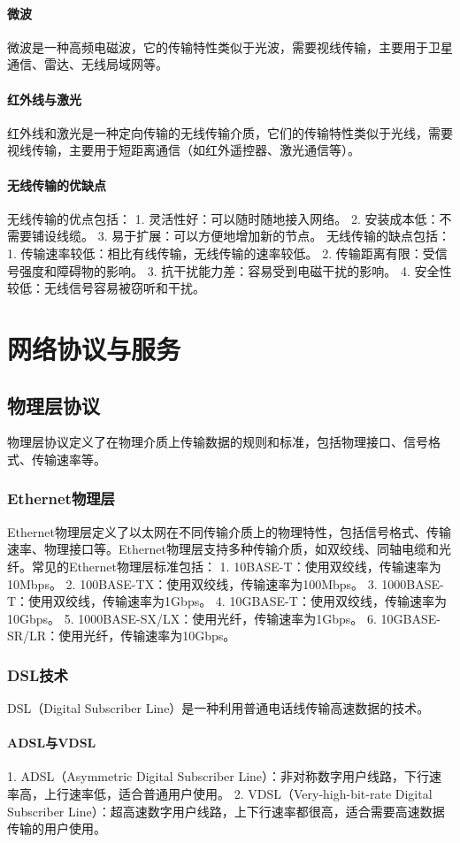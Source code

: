 \documentclass{book}
\begin{document}
\subsubsection{微波}
微波是一种高频电磁波，它的传输特性类似于光波，需要视线传输，主要用于卫星通信、雷达、无线局域网等。
\subsubsection{红外线与激光}
红外线和激光是一种定向传输的无线传输介质，它们的传输特性类似于光线，需要视线传输，主要用于短距离通信（如红外遥控器、激光通信等）。
\subsubsection{无线传输的优缺点}
无线传输的优点包括：
1. 灵活性好：可以随时随地接入网络。
2. 安装成本低：不需要铺设线缆。
3. 易于扩展：可以方便地增加新的节点。
无线传输的缺点包括：
1. 传输速率较低：相比有线传输，无线传输的速率较低。
2. 传输距离有限：受信号强度和障碍物的影响。
3. 抗干扰能力差：容易受到电磁干扰的影响。
4. 安全性较低：无线信号容易被窃听和干扰。

\chapter{网络协议与服务}
\section{物理层协议}
物理层协议定义了在物理介质上传输数据的规则和标准，包括物理接口、信号格式、传输速率等。
\subsection{Ethernet物理层}
Ethernet物理层定义了以太网在不同传输介质上的物理特性，包括信号格式、传输速率、物理接口等。Ethernet物理层支持多种传输介质，如双绞线、同轴电缆和光纤。常见的Ethernet物理层标准包括：
1. 10BASE-T：使用双绞线，传输速率为10Mbps。
2. 100BASE-TX：使用双绞线，传输速率为100Mbps。
3. 1000BASE-T：使用双绞线，传输速率为1Gbps。
4. 10GBASE-T：使用双绞线，传输速率为10Gbps。
5. 1000BASE-SX/LX：使用光纤，传输速率为1Gbps。
6. 10GBASE-SR/LR：使用光纤，传输速率为10Gbps。
\subsection{DSL技术}
DSL（Digital Subscriber Line）是一种利用普通电话线传输高速数据的技术。
\subsubsection{ADSL与VDSL}
1. ADSL（Asymmetric Digital Subscriber Line）：非对称数字用户线路，下行速率高，上行速率低，适合普通用户使用。
2. VDSL（Very-high-bit-rate Digital Subscriber Line）：超高速数字用户线路，上下行速率都很高，适合需要高速数据传输的用户使用。
\end{document}
